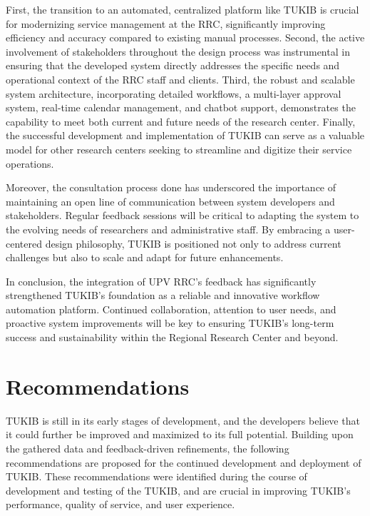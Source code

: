First, the transition to an automated, centralized platform like TUKIB is crucial for modernizing service management at the RRC, significantly improving efficiency and accuracy compared to existing manual processes. Second, the active involvement of stakeholders throughout the design process was instrumental in ensuring that the developed system directly addresses the specific needs and operational context of the RRC staff and clients. Third, the robust and scalable system architecture, incorporating detailed workflows, a multi-layer approval system, real-time calendar management, and chatbot support, demonstrates the capability to meet both current and future needs of the research center. Finally, the successful development and implementation of TUKIB can serve as a valuable model for other research centers seeking to streamline and digitize their service operations.

Moreover, the consultation process done has underscored the importance of maintaining an open line of communication between system developers and stakeholders. Regular feedback sessions will be critical to adapting the system to the evolving needs of researchers and administrative staff. By embracing a user-centered design philosophy, TUKIB is positioned not only to address current challenges but also to scale and adapt for future enhancements.

In conclusion, the integration of UPV RRC’s feedback has significantly strengthened TUKIB’s foundation as a reliable and innovative workflow automation platform. Continued collaboration, attention to user needs, and proactive system improvements will be key to ensuring TUKIB’s long-term success and sustainability within the Regional Research Center and beyond.

\section{Recommendations}

TUKIB is still in its early stages of development, and the developers believe
that it could further be improved and maximized to its full potential. Building upon the gathered data and feedback-driven refinements, the following recommendations are proposed for the continued development and deployment of TUKIB. These recommendations were identified during the course of development and testing of the TUKIB, and are crucial in improving TUKIB's performance, quality of service, and user experience.

